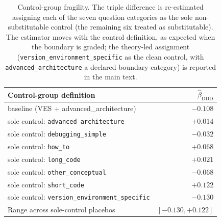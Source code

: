 \begin{table}[ht]
\centering
\caption{Control-group fragility. The triple difference is re-estimated assigning each of the seven question categories as the sole non-substitutable control (the remaining six treated as substitutable). The estimator moves with the control definition, as expected when the boundary is graded; the theory-led assignment (\texttt{version\_environment\_specific} as the clean control, with \texttt{advanced\_architecture} a declared boundary category) is reported in the main text.}
\label{tab:control_fragility}
\small
\begin{tabular}{lr}
\toprule
Control-group definition & $\hat\beta_{\text{DDD}}$ \\
\midrule
baseline (VES + advanced\_architecture) & $-0.108$ \\
sole control: \texttt{advanced\_architecture} & $+0.014$ \\
sole control: \texttt{debugging\_simple} & $-0.032$ \\
sole control: \texttt{how\_to} & $+0.068$ \\
sole control: \texttt{long\_code} & $+0.021$ \\
sole control: \texttt{other\_conceptual} & $-0.068$ \\
sole control: \texttt{short\_code} & $+0.122$ \\
sole control: \texttt{version\_environment\_specific} & $-0.130$ \\
\midrule
Range across sole-control placebos & $[-0.130, +0.122]$ \\
\bottomrule
\end{tabular}
\end{table}
